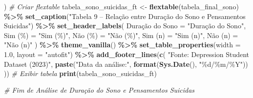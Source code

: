 \documentclass[
]{article}
\newenvironment{Shaded}{\begin{snugshade}}{\end{snugshade}}
\newcommand{\AttributeTok}[1]{\textcolor[rgb]{0.13,0.29,0.53}{#1}}
\newcommand{\CommentTok}[1]{\textcolor[rgb]{0.56,0.35,0.01}{\textit{#1}}}
\newcommand{\FloatTok}[1]{\textcolor[rgb]{0.00,0.00,0.81}{#1}}
\newcommand{\FunctionTok}[1]{\textcolor[rgb]{0.13,0.29,0.53}{\textbf{#1}}}
\newcommand{\NormalTok}[1]{#1}
\newcommand{\OtherTok}[1]{\textcolor[rgb]{0.56,0.35,0.01}{#1}}
\newcommand{\SpecialCharTok}[1]{\textcolor[rgb]{0.81,0.36,0.00}{\textbf{#1}}}
\newcommand{\StringTok}[1]{\textcolor[rgb]{0.31,0.60,0.02}{#1}}
\begin{document}
\begin{Shaded}
\begin{Highlighting}[]
\NormalTok{  )}
\CommentTok{\# Criar flextable}
\NormalTok{tabela\_sono\_suicidas\_ft }\OtherTok{\textless{}{-}} \FunctionTok{flextable}\NormalTok{(tabela\_final\_sono) }\SpecialCharTok{\%\textgreater{}\%}
  \FunctionTok{set\_caption}\NormalTok{(}\StringTok{"Tabela 9 – Relação entre Duração do Sono e Pensamentos Suicidas"}\NormalTok{) }\SpecialCharTok{\%\textgreater{}\%}
  \FunctionTok{set\_header\_labels}\NormalTok{(}
    \StringTok{\textasciigrave{}}\AttributeTok{Duração do Sono}\StringTok{\textasciigrave{}} \OtherTok{=} \StringTok{"Duração do Sono"}\NormalTok{,}
    \StringTok{\textasciigrave{}}\AttributeTok{Sim (\%)}\StringTok{\textasciigrave{}} \OtherTok{=} \StringTok{"Sim (\%)"}\NormalTok{,}
    \StringTok{\textasciigrave{}}\AttributeTok{Não (\%)}\StringTok{\textasciigrave{}} \OtherTok{=} \StringTok{"Não (\%)"}\NormalTok{,}
    \StringTok{\textasciigrave{}}\AttributeTok{Sim (n)}\StringTok{\textasciigrave{}} \OtherTok{=} \StringTok{"Sim (n)"}\NormalTok{,}
    \StringTok{\textasciigrave{}}\AttributeTok{Não (n)}\StringTok{\textasciigrave{}} \OtherTok{=} \StringTok{"Não (n)"}
\NormalTok{  ) }\SpecialCharTok{\%\textgreater{}\%}
  \FunctionTok{theme\_vanilla}\NormalTok{() }\SpecialCharTok{\%\textgreater{}\%}
  \FunctionTok{set\_table\_properties}\NormalTok{(}\AttributeTok{width =} \FloatTok{1.0}\NormalTok{, }\AttributeTok{layout =} \StringTok{"autofit"}\NormalTok{) }\SpecialCharTok{\%\textgreater{}\%}
  \FunctionTok{add\_footer\_lines}\NormalTok{(}\FunctionTok{c}\NormalTok{(}
    \StringTok{"Fonte: Depression Student Dataset (2023)"}\NormalTok{,}
    \FunctionTok{paste}\NormalTok{(}\StringTok{"Data da análise:"}\NormalTok{, }\FunctionTok{format}\NormalTok{(}\FunctionTok{Sys.Date}\NormalTok{(), }\StringTok{"\%d/\%m/\%Y"}\NormalTok{))}
\NormalTok{  ))}
\CommentTok{\# Exibir tabela}
\FunctionTok{print}\NormalTok{(tabela\_sono\_suicidas\_ft)}

\CommentTok{\# Fim de Análise de Duração do Sono e Pensamentos Suicidas}


\end{Highlighting}
\end{Shaded}
\end{document}
